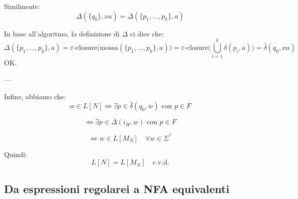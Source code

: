 {\begin{itemize}
    Similmente:
    \[
        \Delta(\{q_0\}, xa) = \Delta(\{p_1, \dots, p_k\}, a)
    \]
    
    In base all'algoritmo, la definizione di \(\Delta\) ci dice che:
    \[
        \Delta(\{p_1, \dots, p_k\}, a) = \varepsilon\text{-closure}\big(\text{mossa}(\{p_1, \dots, p_k\}, a)\big)= \varepsilon\text{-closure}\big(\bigcup_{i=1}^{k} \delta(p_i, a)\big)= \hat{\delta}(q_0, xa)
    \]
    OK.
    
    ---
    
    Infine, abbiamo che:
    \[
        w \in L[N] \iff \exists p \in \hat{\delta}(q_0, w) \text{ con } p \in F
    \]
    
    \[
        \iff \exists p \in \Delta(i_H, w) \text{ con } p \in F
    \]
    
    \[
        \iff w \in L[M_N] \quad \forall w \in \Sigma^*
    \]
    
    Quindi:
    \[
        L[N] = L[M_N] \quad \text{c.v.d.}
    \]
    
\end{itemize}

}

\subsection{Da espressioni regolarei a NFA equivalenti}

